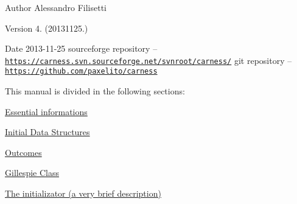 \begin{DoxyAuthor}{Author}
Alessandro Filisetti 
\end{DoxyAuthor}
\begin{DoxyVersion}{Version}
4. (20131125.) 
\end{DoxyVersion}
\begin{DoxyDate}{Date}
2013-\/11-\/25 sourceforge repository -- \href{https://carness.svn.sourceforge.net/svnroot/carness/}{\tt https\-://carness.\-svn.\-sourceforge.\-net/svnroot/carness/} git repository -- \href{https://github.com/paxelito/carness}{\tt https\-://github.\-com/paxelito/carness}
\end{DoxyDate}
This manual is divided in the following sections\-:
\begin{DoxyItemize}
\item \hyperlink{intro}{Essential informations}
\item \hyperlink{pageInitStr}{Initial Data Structures}
\item \hyperlink{pageoutcomes}{Outcomes}
\item \hyperlink{pageGillespie}{Gillespie Class}
\item \hyperlink{pageInitializator}{The initializator (a very brief description)} 
\end{DoxyItemize}